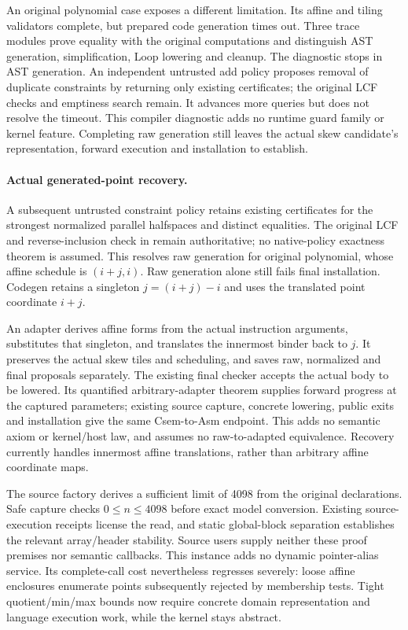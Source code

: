 An original polynomial case exposes a different limitation. Its affine and
tiling validators complete, but prepared code generation times out. Three
trace modules prove equality with the original computations and distinguish
AST generation, simplification, Loop lowering and cleanup. The diagnostic
stops in AST generation. An independent untrusted add policy proposes removal
of duplicate constraints by returning only existing certificates; the original
LCF checks and emptiness search remain. It advances more queries but does not
resolve the timeout. This compiler diagnostic adds no runtime guard family or
kernel feature. Completing raw generation still leaves the actual skew
candidate's representation, forward execution and installation to establish.

\paragraph{Actual generated-point recovery.}
A subsequent untrusted constraint policy retains existing certificates for the
strongest normalized parallel halfspaces and distinct equalities. The original
LCF and reverse-inclusion check in  remain authoritative;
no native-policy exactness theorem is assumed. This resolves raw generation for
original polynomial, whose affine schedule is $(i+j,i)$. Raw generation alone
still fails final installation. Codegen retains a singleton $j=(i+j)-i$ and
uses the translated point coordinate $i+j$.

An adapter derives affine forms from the actual instruction arguments,
substitutes that singleton, and translates the innermost binder back to $j$.
It preserves the actual skew tiles and scheduling, and saves raw, normalized
and final proposals separately. The existing final checker accepts the actual
body to be lowered. Its quantified arbitrary-adapter theorem supplies forward
progress at the captured parameters; existing source capture, concrete
lowering, public exits and installation give the same Csem-to-Asm endpoint.
This adds no semantic axiom or kernel/host law, and assumes no raw-to-adapted
equivalence. Recovery currently handles innermost affine translations, rather
than arbitrary affine coordinate maps.

The source factory derives a sufficient limit of 4098 from the original
declarations. Safe capture checks $0\leq n\leq4098$ before exact model conversion.
Existing source-execution receipts license the read, and static global-block
separation establishes the relevant array/header stability. Source users supply
neither these proof premises nor semantic callbacks. This instance adds no
dynamic pointer-alias service. Its complete-call cost nevertheless regresses
severely: loose affine enclosures enumerate points subsequently rejected by
membership tests. Tight quotient/min/max bounds now require concrete domain
representation and language execution work, while the kernel stays abstract.

